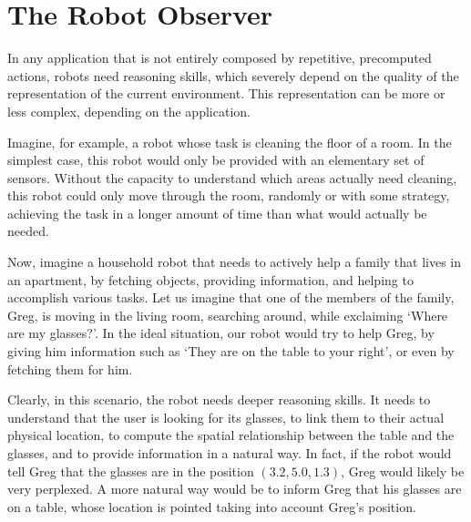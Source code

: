 \part{The Robot Observer} %
\label{part:robot_observer} %



In any application that is not entirely composed by repetitive, precomputed actions, robots need reasoning skills, which severely depend on the quality of the representation of the current environment. This representation can be more or less complex, depending on the application. 

Imagine, for example, a robot whose task is cleaning the floor of a room. In the simplest case, this robot would only be provided with an elementary set of sensors. Without the capacity to understand which areas actually need cleaning, this robot could only move through the room, randomly or with some strategy, achieving the task in a longer amount of time than what would actually be needed. 


Now, imagine a household robot that needs to actively help a family that lives in an apartment, by fetching objects, providing information, and helping to accomplish various tasks. Let us imagine that one of the members of the family, Greg, is moving in the living room, searching around, while exclaiming `Where are my glasses?'. In the ideal situation, our robot would try to help Greg, by giving him information such as `They are on the table to your right', or even by fetching them for him. 

Clearly, in this scenario, the robot needs deeper reasoning skills. It needs to understand that the user is looking for its glasses, to link them to their actual physical location, to compute the spatial relationship between the table and the glasses, and to provide information in a natural way. In fact, if the robot would tell Greg that the glasses are in the position $(3.2, 5.0 , 1.3)$, Greg would likely be very perplexed. A more natural way would be to inform Greg that his glasses are on a table, whose location is pointed taking into account Greg's position.

